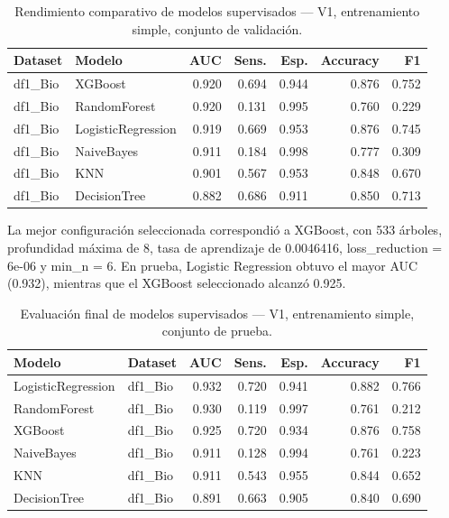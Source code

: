 \begin{table}[H]
  \centering
  \caption[V1 sin CV validación]{Rendimiento comparativo de modelos supervisados --- V1, entrenamiento simple, conjunto de validación.}
  \label{tab:v1-nocv-base}
  \scriptsize
  \begin{tabular}{llrrrrr}
    \toprule
    \textbf{Dataset} & \textbf{Modelo} & \textbf{AUC} & \textbf{Sens.} & \textbf{Esp.} & \textbf{Accuracy} & \textbf{F1} \\
    \midrule
    df1\_Bio & XGBoost            & 0.920 & 0.694 & 0.944 & 0.876 & 0.752 \\
    df1\_Bio & RandomForest       & 0.920 & 0.131 & 0.995 & 0.760 & 0.229 \\
    df1\_Bio & LogisticRegression & 0.919 & 0.669 & 0.953 & 0.876 & 0.745 \\
    df1\_Bio & NaiveBayes         & 0.911 & 0.184 & 0.998 & 0.777 & 0.309 \\
    df1\_Bio & KNN                & 0.901 & 0.567 & 0.953 & 0.848 & 0.670 \\
    df1\_Bio & DecisionTree       & 0.882 & 0.686 & 0.911 & 0.850 & 0.713 \\
    \bottomrule
  \end{tabular}
\end{table}

La mejor configuración seleccionada correspondió a XGBoost, con 533 árboles,
profundidad máxima de 8, tasa de aprendizaje de 0.0046416, loss\_reduction =
6e-06 y min\_n = 6. En prueba, Logistic Regression obtuvo el mayor AUC (0.932),
mientras que el XGBoost seleccionado alcanzó 0.925.

\begin{table}[H]
  \centering
  \caption[V1 sin CV prueba]{Evaluación final de modelos supervisados --- V1, entrenamiento simple, conjunto de prueba.}
  \label{tab:v1-nocv-test}
  \scriptsize
  \begin{tabular}{llrrrrr}
    \toprule
    \textbf{Modelo} & \textbf{Dataset} & \textbf{AUC} & \textbf{Sens.} & \textbf{Esp.} & \textbf{Accuracy} & \textbf{F1} \\
    \midrule
    LogisticRegression & df1\_Bio & 0.932 & 0.720 & 0.941 & 0.882 & 0.766 \\
    RandomForest       & df1\_Bio & 0.930 & 0.119 & 0.997 & 0.761 & 0.212 \\
    XGBoost            & df1\_Bio & 0.925 & 0.720 & 0.934 & 0.876 & 0.758 \\
    NaiveBayes         & df1\_Bio & 0.911 & 0.128 & 0.994 & 0.761 & 0.223 \\
    KNN                & df1\_Bio & 0.911 & 0.543 & 0.955 & 0.844 & 0.652 \\
    DecisionTree       & df1\_Bio & 0.891 & 0.663 & 0.905 & 0.840 & 0.690 \\
    \bottomrule
  \end{tabular}
\end{table}

